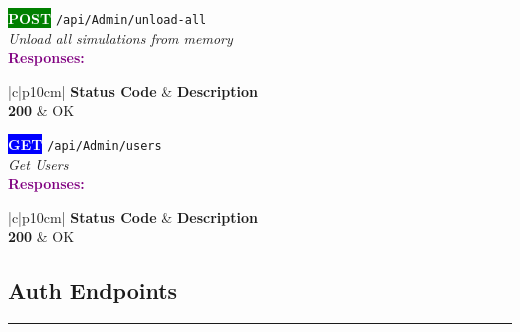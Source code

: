 \begin{tcolorbox}[
    colback=green!5,
    colframe=green,
    arc=2mm,
    boxrule=1pt,
    left=5pt,
    right=5pt,
    top=5pt,
    bottom=5pt
]
\noindent\colorbox{green}{\textcolor{white}{\textbf{POST}}} 
\texttt{\large /api/Admin/unload-all}\\[0.3em]
\textit{Unload all simulations from memory}\\[0.3em]
\vspace{0.3em}
\textbf{\textcolor{purple}{Responses:}}\\[0.2em]
\begin{tabular}{|c|p{10cm}|}
\hline
{}
\textbf{Status Code} & \textbf{Description} \\ \hline
\colorbox{green!20}{\textbf{200}} & OK \\ \hline
\end{tabular}
\end{tcolorbox}
\vspace{0.5em}

\begin{tcolorbox}[
    colback=blue!5,
    colframe=blue,
    arc=2mm,
    boxrule=1pt,
    left=5pt,
    right=5pt,
    top=5pt,
    bottom=5pt
]
\noindent\colorbox{blue}{\textcolor{white}{\textbf{GET}}} 
\texttt{\large /api/Admin/users}\\[0.3em]
\textit{Get Users}\\[0.3em]
\vspace{0.3em}
\textbf{\textcolor{purple}{Responses:}}\\[0.2em]
\begin{tabular}{|c|p{10cm}|}
\hline
{}
\textbf{Status Code} & \textbf{Description} \\ \hline
\colorbox{green!20}{\textbf{200}} & OK \\ \hline
\end{tabular}
\end{tcolorbox}
\vspace{0.5em}

\subsection{Auth Endpoints}

\noindent\textcolor{gray!60}{\rule{\linewidth}{0.5pt}}
\vspace{0.5em}

